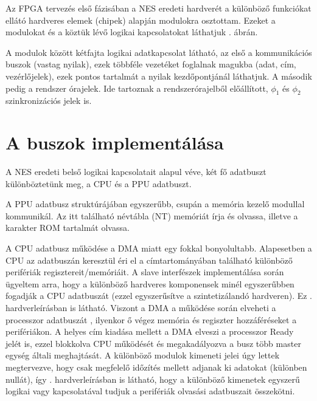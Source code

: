 Az FPGA tervezés első fázisában a NES eredeti hardverét a különböző funkciókat ellátó hardveres elemek (chipek) alapján modulokra osztottam. Ezeket a modulokat és a köztük lévő logikai kapcsolatokat láthatjuk . ábrán.

A modulok között kétfajta logikai adatkapcsolat látható, az első a kommunikációs buszok (vastag nyilak), ezek többféle vezetéket foglalnak magukba (adat, cím, vezérlőjelek), ezek pontos tartalmát a nyilak kezdőpontjánál láthatjuk. A második pedig a rendszer órajelek. Ide tartoznak a rendszerórajelből előállított, $\phi_1$ és $\phi_2$ szinkronizációs jelek is.

\section{A buszok implementálása}

A NES eredeti belső logikai kapcsolatait alapul véve, két fő adatbuszt különböztetünk meg, a CPU és a PPU adatbuszt. 

A PPU adatbusz struktúrájában egyszerűbb, csupán a memória %
kezelő modullal kommunikál. Az itt található névtábla (NT) memóriát írja és olvassa, illetve a karakter ROM tartalmát olvassa. %

A CPU adatbusz működése a DMA miatt egy fokkal bonyolultabb. Alapesetben a CPU az adatbuszán keresztül éri el a címtartományában található különböző perifériák regisztereit/memóriáit. A slave interfészek implementálása során ügyeltem arra, hogy a különböző hardveres komponensek minél egyszerűbben fogadják a CPU adatbuszát (ezzel egyszerűsítve a szintetizálandó hardveren). Ez . hardverleírásban is látható. Viszont a DMA a működése során elveheti a processzor adatbuszát%
, ilyenkor ő végez memória és regiszter hozzáféréseket a perifériákon. A helyes cím kiadása mellett a DMA elveszi a processzor Ready jelét is, ezzel blokkolva CPU működését és megakadályozva a busz több master egység általi meghajtását. A különböző modulok kimeneti jelei úgy lettek megtervezve, hogy csak megfelelő időzítés mellett adjanak ki adatokat (különben nullát), így . hardverleírásban is látható, hogy a különböző kimenetek egyszerű logikai vagy kapcsolatával tudjuk a perifériák olvasási adatbuszait összekötni.

